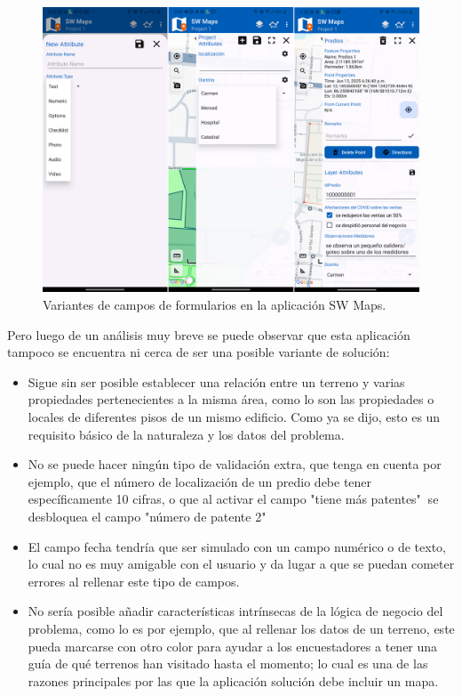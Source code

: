 \begin{figure}[h]
    \centering
    \includegraphics[scale=0.15]{Graphics/sw_maps_campos.png}
    \caption{Variantes de campos de formularios en la aplicación SW Maps.}
    \label{fig:figura9}
\end{figure}

Pero luego de un análisis muy breve se puede observar que esta aplicación tampoco se encuentra ni cerca de ser una posible variante de solución:
\begin{itemize}
    \item Sigue sin ser posible establecer una relación entre un terreno y varias propiedades pertenecientes a la misma área, como lo son las propiedades o locales de diferentes pisos de un mismo edificio. Como ya se dijo, esto es un requisito básico de la naturaleza y los datos del problema.
    \item No se puede hacer ningún tipo de validación extra, que tenga en cuenta por ejemplo, que el número de localización de un predio debe tener específicamente 10 cifras, o que al activar el campo "tiene más patentes" $~$se desbloquea el campo "número de patente 2"
    \item El campo fecha tendría que ser simulado con un campo numérico o de texto, lo cual no es muy amigable con el usuario y da lugar a que se puedan cometer errores al rellenar este tipo de campos.
    \item No sería posible añadir características intrínsecas de la lógica de negocio del problema, como lo es por ejemplo, que al rellenar los datos de un terreno, este pueda marcarse con otro color para ayudar a los encuestadores a tener una guía de qué terrenos han visitado hasta el momento; lo cual es una de las razones principales por las que la aplicación solución debe incluir un mapa.
\end{itemize}







